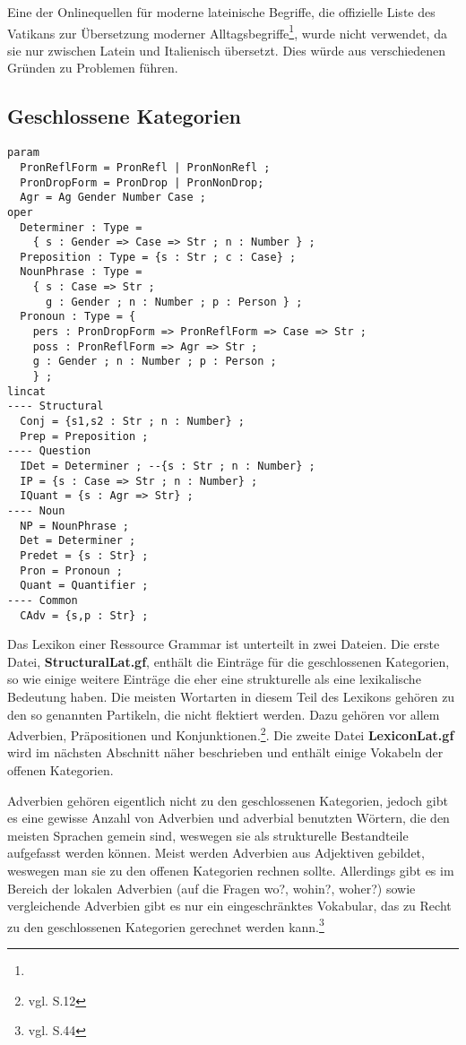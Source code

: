 Eine der Onlinequellen für moderne lateinische Begriffe, die offizielle Liste des Vatikans zur Übersetzung moderner Alltagsbegriffe\footnote{\vatlatinitas}, wurde nicht verwendet, da sie nur zwischen Latein und Italienisch übersetzt. Dies würde aus verschiedenen Gründen zu Problemen führen.
\subsection{Geschlossene Kategorien}
\label{subsec:geschlossene}
\begin{lstlisting}[float=h!tp,caption={Für \textbf{StructuralLat.gf} nötige \texttt{lincat}-Definitionen für geschlossene Kategorien},label={GF-Structural-Lincat},basicstyle=\small]
param
  PronReflForm = PronRefl | PronNonRefl ;
  PronDropForm = PronDrop | PronNonDrop;
  Agr = Ag Gender Number Case ;
oper
  Determiner : Type = 
    { s : Gender => Case => Str ; n : Number } ;
  Preposition : Type = {s : Str ; c : Case} ;
  NounPhrase : Type = 
    { s : Case => Str ; 
      g : Gender ; n : Number ; p : Person } ;
  Pronoun : Type = {
    pers : PronDropForm => PronReflForm => Case => Str ;
    poss : PronReflForm => Agr => Str ;
    g : Gender ; n : Number ; p : Person ;
    } ;
lincat
---- Structural
  Conj = {s1,s2 : Str ; n : Number} ;
  Prep = Preposition ;
---- Question
  IDet = Determiner ; --{s : Str ; n : Number} ;
  IP = {s : Case => Str ; n : Number} ;
  IQuant = {s : Agr => Str} ;
---- Noun
  NP = NounPhrase ;
  Det = Determiner ;
  Predet = {s : Str} ;
  Pron = Pronoun ;
  Quant = Quantifier ;
---- Common
  CAdv = {s,p : Str} ; 
\end{lstlisting}
Das Lexikon einer Ressource Grammar ist unterteilt in zwei Dateien. Die erste Datei, \textbf{StructuralLat.gf}, enthält die Einträge für die geschlossenen Kategorien, so wie einige weitere Einträge die eher eine strukturelle als eine lexikalische Bedeutung haben. Die meisten Wortarten in diesem Teil des Lexikons gehören zu den so genannten Partikeln, die nicht flektiert werden. Dazu gehören vor allem Adverbien, Präpositionen und Konjunktionen.\footnote{vgl. \cite{BAYER-LINDAUER1994} S.12}. Die zweite Datei \textbf{LexiconLat.gf} wird im nächsten Abschnitt näher beschrieben und enthält einige Vokabeln der offenen Kategorien. \par
Adverbien gehören eigentlich nicht zu den geschlossenen Kategorien, jedoch gibt es eine gewisse Anzahl von Adverbien und adverbial benutzten Wörtern, die den meisten Sprachen gemein sind, weswegen sie als strukturelle Bestandteile aufgefasst werden können. Meist werden Adverbien aus Adjektiven gebildet, weswegen man sie zu den offenen Kategorien rechnen sollte. Allerdings gibt es im  Bereich der lokalen Adverbien (auf die Fragen wo?, wohin?, woher?) sowie vergleichende Adverbien gibt es nur ein eingeschränktes Vokabular, das zu Recht zu den geschlossenen Kategorien gerechnet werden kann.\footnote{vgl. \cite{BAYER-LINDAUER1994} S.44} 
